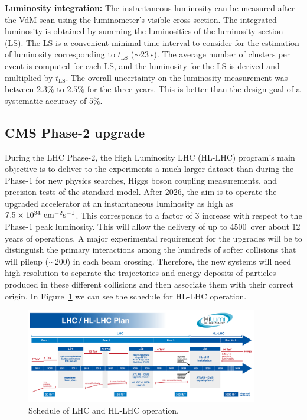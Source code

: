 \textbf{Luminosity integration:} The instantaneous luminosity can be measured after the VdM scan using the luminometer's visible cross-section. The integrated luminosity is obtained by summing the luminosities of the luminosity section (LS). The LS is a convenient minimal time interval to consider for the estimation of luminosity corresponding to $t_{\text{LS}}$ ($\sim 23~\text{s}$). The average number of clusters per event is computed for each LS, and the luminosity for the LS is derived and multiplied by $t_{\text{LS}}$. The overall uncertainty on the luminosity measurement was between $2.3\%$ to $2.5\%$ for the three years. This is better than the design goal of a systematic accuracy of $5\%$.

\subsection{CMS Phase-2 upgrade}

During the LHC Phase-2, the High Luminosity LHC (HL-LHC) program's main objective is to deliver to the experiments a much larger dataset than during the Phase-1 for new physics searches, Higgs boson coupling measurements, and precision tests of the standard model. After 2026, the aim is to operate the upgraded accelerator at an instantaneous luminosity as high as $7.5 \times 10^{34}~\text{cm}^{-2}\text{s}^{-1}$. This corresponds to a factor of 3 increase with respect to the Phase-1 peak luminosity. This will allow the delivery of up to 4500~\fb over about 12 years of operations. A major experimental requirement for the upgrades will be to distinguish the primary interactions among the hundreds of softer collisions that will pileup ($\sim 200$) in each beam crossing. Therefore, the new systems will need high resolution to separate the trajectories and energy deposits of particles produced in these different collisions and then associate them with their correct origin. In Figure~\ref{fig:HLLHC} we can see the schedule for HL-LHC operation.

\begin{figure}[htbp]
  \centering
  \includegraphics[width=0.9\textwidth]{plots/chapter3/HLLHC.png}
  \caption{Schedule of LHC and HL-LHC operation.}
  \label{fig:HLLHC}
\end{figure}

